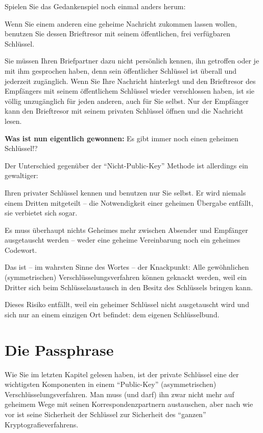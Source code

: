 \documentclass[a4paper,11pt, oneside,openright,titlepage,dvips]{scrbook}
\newcommand{\IncludeImage}[2][]{\texorhtml{%
\texttt{[image: \#2]}%
}{%
\htmlimg{#2.png}%
}}
\newcounter{part}
\newcounter{chapter}
\begin{document}
Spielen Sie das Gedankenspiel noch einmal anders herum:

Wenn Sie einem anderen eine geheime Nachricht zukommen lassen wollen,
benutzen Sie dessen Brieftresor mit seinem öffentlichen, frei
verfügbaren Schlüssel.

Sie müssen Ihren Briefpartner dazu nicht persönlich kennen, ihn
getroffen oder je mit ihm gesprochen haben, denn sein öffentlicher
Schlüssel ist überall und jederzeit zugänglich. Wenn Sie Ihre
Nachricht hinterlegt und den Brieftresor des Empfängers mit seinem
öffentlichem Schlüssel wieder verschlossen haben, ist sie völlig
unzugänglich für jeden anderen, auch für Sie selbst.  Nur der
Empfänger kann den Brieftresor mit seinem privaten Schlüssel öffnen
und die Nachricht lesen.

\begin{center}
\IncludeImage[width=0.9\textwidth]{pk-safe-opened-with-sk}
\end{center}


\clearpage
\textbf{Was ist nun eigentlich gewonnen:} Es gibt immer noch einen
geheimen Schlüssel!?

Der Unterschied gegenüber der "`Nicht-Public-Key"' Methode ist
allerdings ein gewaltiger:

Ihren privater Schlüssel kennen und benutzen nur Sie selbst.  Er wird
niemals einem Dritten mitgeteilt ­-- die Notwendigkeit einer geheimen
Übergabe entfällt, sie verbietet sich sogar.

Es muss überhaupt nichts Geheimes mehr zwischen Absender und Empfänger
ausgetauscht werden -- weder eine geheime Vereinbarung noch ein
geheimes Codewort.

Das ist ­-- im wahrsten Sinne des Wortes -- der Knackpunkt: Alle
gewöhnlichen (symmetrischen) Verschlüsselungsverfahren können geknackt werden, weil ein
Dritter sich beim Schlüsselaustausch in den Besitz des Schlüssels
bringen kann.

Dieses Risiko entfällt, weil ein geheimer Schlüssel nicht ausgetauscht
wird und sich nur an einem einzigen Ort befindet: dem eigenen Schlüsselbund.


\clearpage
\chapter{Die Passphrase}
\label{ch:passphrase}

Wie Sie im letzten Kapitel gelesen haben, ist der private Schlüssel eine der
wichtigsten Komponenten in einem "`Public-Key"' (asymmetrischen)
Verschlüsselungsverfahren. Man muss
(und darf) ihn zwar nicht mehr auf geheimem Wege mit seinen
Korrespondenzpartnern austauschen, aber nach wie vor ist seine
Sicherheit der Schlüssel zur Sicherheit des "`ganzen"' 
Kryptografieverfahrens.
\end{document}
